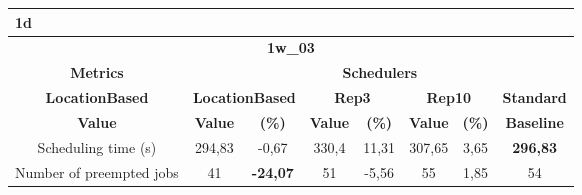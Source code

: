 \begin{table}[]
\begin{tabular}{cccccccc}
\multicolumn{8}{l}{1d}                                                                                                                                                                                                                                                                                                         \\ \hline
\multicolumn{8}{|c|}{\textbf{1w\_03}}                                                                                                                                                                                                                                                                                          \\ \hline
\multicolumn{1}{|c|}{\textbf{Metrics}}           & \multicolumn{7}{c|}{\textbf{Schedulers}}                                                                                                                                                                                                                                    \\ \hline
\multicolumn{1}{|c|}{\textbf{LocationBased}}     & \multicolumn{2}{c|}{\textbf{LocationBased}}                                & \multicolumn{2}{c|}{\textbf{Rep3}}                                         & \multicolumn{2}{c|}{\textbf{Rep10}}                                      & \multicolumn{1}{c|}{\textbf{Standard}} \\ \hline
\multicolumn{1}{|c|}{\textbf{Value}}             & \multicolumn{1}{c|}{\textbf{Value}} & \multicolumn{1}{c|}{\textbf{(\%)}}   & \multicolumn{1}{c|}{\textbf{Value}} & \multicolumn{1}{c|}{\textbf{(\%)}}   & \multicolumn{1}{c|}{\textbf{Value}} & \multicolumn{1}{c|}{\textbf{(\%)}} & \multicolumn{1}{c|}{\textbf{Baseline}} \\ \hline
\multicolumn{1}{|c|}{Scheduling time (s)}        & \multicolumn{1}{c|}{294,83}         & \multicolumn{1}{c|}{-0,67}           & \multicolumn{1}{c|}{330,4}          & \multicolumn{1}{c|}{11,31}           & \multicolumn{1}{c|}{307,65}         & \multicolumn{1}{c|}{3,65}          & \multicolumn{1}{c|}{\textbf{296,83}}   \\ \hline
\multicolumn{1}{|c|}{Number of preempted jobs}   & \multicolumn{1}{c|}{41}             & \multicolumn{1}{c|}{\textbf{-24,07}} & \multicolumn{1}{c|}{51}             & \multicolumn{1}{c|}{-5,56}           & \multicolumn{1}{c|}{55}             & \multicolumn{1}{c|}{1,85}          & \multicolumn{1}{c|}{54}                \\ \hline

\end{tabular}
\end{table}

